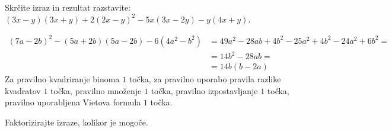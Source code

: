 \documentclass[addpoints]{exam}
\begin{document}
\begin{questions}
        


    \question[5]
    Skrčite izraz in rezultat razstavite: $(3x-y)(3x+y)+2(2x-y)^2-5x(3x-2y)-y(4x+y)$.

    \begin{solution}[8cm]
        \begin{align*}
            (7a-2b)^2-(5a+2b)(5a-2b)-6(4a^2-b^2)&=49a^2-28ab+4b^2-25a^2+4b^2-24a^2+6b^2=\\
                &=14b^2-28ab= \\
                &=14b(b-2a)
        \end{align*}
        Za pravilno kvadriranje binoma $1$ točka, za pravilno uporabo pravila razlike kvadratov $1$ točka, pravilno množenje $1$ točka, pravilno izpostavljanje $1$ točka, pravilno uporabljena Vietova formula $1$ točka.
    \end{solution}
    

    \question
    Faktorizirajte izraze, kolikor je mogoče.
\end{questions}
\end{document}

